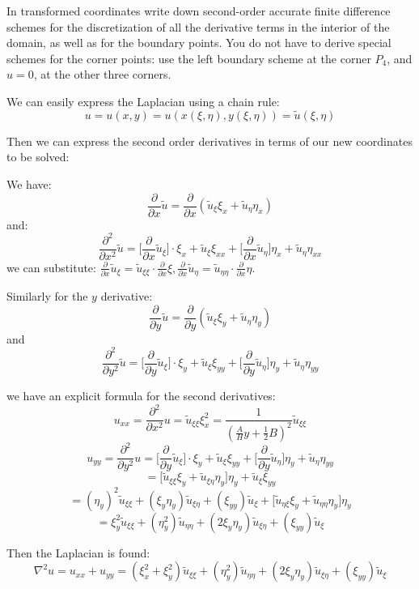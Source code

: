 \documentclass[12pt]{article}
\newcommand{\pdx}[1]{\frac{\partial}{\partial {#1}}}
\newcommand{\pddx}[1]{\frac{\partial^2}{\partial {#1}^2}}
\begin{document}
In transformed coordinates write down second-order accurate finite difference schemes for the discretization of all the derivative terms in the interior of the domain, as well as for the boundary points. You do not have to derive
special schemes for the corner points: use the left boundary scheme at the corner $P_4$, and $u=0$, at the other three corners.


We can easily express the Laplacian using a chain rule:
$$
	u = u(x,y) = u(x(\xi,\eta),y(\xi,\eta)) = \tilde{u}(\xi,\eta)
$$

Then we can express the second order derivatives in terms of our new coordinates to be solved:

We have:
$$
	\pdx{x} \tilde{u} = \pdx{x} (\tilde{u}_{\xi}\xi_{x} + \tilde{u}_{\eta} \eta_{x})
$$ and:
$$
	\pddx{x} \tilde{u} = \big[\pdx{x} \tilde{u}_{\xi}\big]\cdot \xi_{x} + \tilde{u}_{\xi}\xi_{xx} + \big[\pdx{x} \tilde{u}_{\eta}\big]\eta_{x} + \tilde{u}_{\eta}\eta_{xx}
$$ we can substitute: $\pdx{x} \tilde{u}_{\xi} = \tilde{u}_{\xi\xi}\cdot \pdx{x}\xi, \pdx{x} \tilde{u}_{\eta} = \tilde{u}_{\eta\eta}\cdot \pdx{x}\eta$.


Similarly for the $y$ derivative:
$$
	\pdx{y} \tilde{u} = \pdx{y} (\tilde{u}_{\xi}\xi_{y} + \tilde{u}_{\eta} \eta_{y})
$$ and
$$
	\pddx{y} \tilde{u} = \big[\pdx{y} \tilde{u}_{\xi}\big]\cdot \xi_{y} + \tilde{u}_{\xi}\xi_{yy} + \big[\pdx{y} \tilde{u}_{\eta}\big]\eta_{y} + \tilde{u}_{\eta}\eta_{yy}
$$

we have an explicit formula for the second derivatives:
$$
	{u}_{xx} = \pddx{x} {u} = \tilde{u}_{\xi\xi}\xi_x^2 = \frac{1}{(\frac{A}{H}y + \frac12 B)^2} \tilde{u}_{\xi\xi}
$$
$$
	{u}_{yy} = \pddx{y} {u} = \big[\pdx{y} \tilde{u}_{\xi}\big]\cdot \xi_{y} + \tilde{u}_{\xi}\xi_{yy} + \big[\pdx{y} \tilde{u}_{\eta}\big]\eta_{y} + \tilde{u}_{\eta}\eta_{yy}
$$
$$
	= \big[ \tilde{u}_{\xi\xi}\xi_{y}+\tilde{u}_{\xi\eta} \eta_{y}\big]\eta_{y} + \tilde{u}_{\xi}\xi_{yy}
$$
$$
	= (\eta_{y})^2 \tilde{u}_{\xi\xi} + (\xi_{y}\eta_{y})\tilde{u}_{\xi\eta} + (\xi_{yy})\tilde{u}_{\xi} + \big[ \tilde{u}_{\eta\xi}\xi_{y}+\tilde{u}_{\eta\eta}\eta_{y} \big]\eta_{y}
$$
$$
	= \xi_{y}^2 \tilde{u}_{\xi\xi} + (\eta_{y}^2)\tilde{u}_{\eta\eta} + (2\xi_{y}\eta_{y})\tilde{u}_{\xi\eta} +(\xi_{yy})\tilde{u}_{\xi}
$$

Then the Laplacian is found:
\begin{equation}
	\nabla^2 {u} = {u}_{xx} + {u}_{yy}
	= (\xi_{x}^2 + \xi_{y}^2) \tilde{u}_{\xi\xi} + (\eta_{y}^2)\tilde{u}_{\eta\eta} + (2\xi_{y}\eta_{y})\tilde{u}_{\xi\eta} +(\xi_{yy})\tilde{u}_{\xi}
\end{equation}
\end{document}
